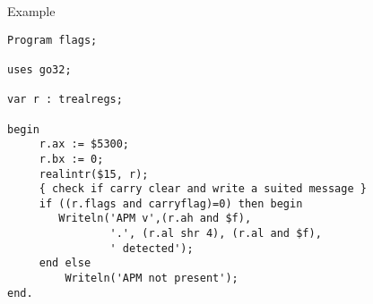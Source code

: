\begin{FPCList}
\item[Example]
\begin{verbatim}
Program flags;

uses go32;

var r : trealregs;

begin
     r.ax := $5300;
     r.bx := 0;
     realintr($15, r);
     { check if carry clear and write a suited message }
     if ((r.flags and carryflag)=0) then begin
        Writeln('APM v',(r.ah and $f), 
                '.', (r.al shr 4), (r.al and $f), 
                ' detected');
     end else
         Writeln('APM not present');
end.\end{verbatim}
\end{FPCList}